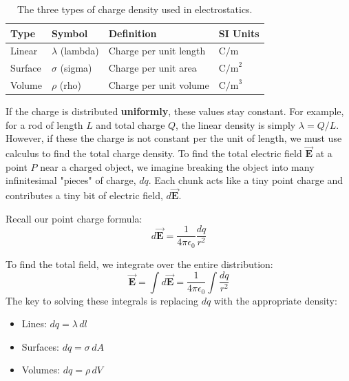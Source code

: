 \begin{table}[H]
    \centering
    \begin{tabular}{llll}
		\hline
        \textbf{Type} & \textbf{Symbol} & \textbf{Definition} & \textbf{SI Units} \\ 
		\hline
        Linear & $\lambda$ (lambda) & Charge per unit length & $\text{C/m}$ \\
        Surface & $\sigma$ (sigma) & Charge per unit area & $\text{C/m}^2$ \\
        Volume & $\rho$ (rho) & Charge per unit volume & $\text{C/m}^3$ \\ 
		\hline
    \end{tabular}
    \caption{The three types of charge density used in electrostatics.}
    \label{tab:densities}
\end{table}
If the charge is distributed \textbf{uniformly}, these values stay constant. For example, for a rod of length $L$ and total charge $Q$, the linear density is simply $\lambda = Q/L$.
However, if these the charge is not constant per the unit of length, we must use calculus to find the total charge density. To find the total electric field $\vec{\mathbf{E}}$ at a point $P$ near a charged object, we imagine breaking the object into many infinitesimal "pieces" of charge, $dq$. Each chunk acts like a tiny point charge and contributes a tiny bit of electric field, $d\vec{\mathbf{E}}$.

Recall our point charge formula:
\begin{equation}
    d\vec{\mathbf{E}} = \frac{1}{4\pi\epsilon_0} \frac{dq}{r^2}
\end{equation}

To find the total field, we integrate over the entire distribution:
\begin{equation}
    \vec{\mathbf{E}} = \int d\vec{\mathbf{E}} = \frac{1}{4\pi\epsilon_0} \int \frac{dq}{r^2}
\end{equation}
The key to solving these integrals is replacing $dq$ with the appropriate density:
\begin{itemize}
    \item Lines: $dq = \lambda \, dl$
    \item Surfaces: $dq = \sigma \, dA$
    \item Volumes: $dq = \rho \, dV$
\end{itemize}

